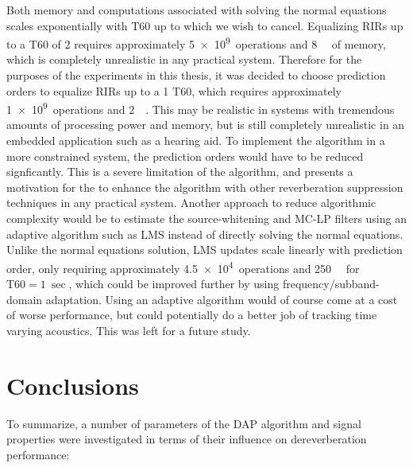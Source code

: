 Both memory and computations associated with solving the normal equations scales exponentially with T60 up to which we wish to cancel. Equalizing RIRs up to a T60 of \qty{2}{\sec} requires approximately \qty{5e9}{operations} and  \qty{8}{\giga\byte} of memory, which is completely unrealistic in any practical system. Therefore for the purposes of the experiments in this thesis, it was decided to choose prediction orders to equalize RIRs up to a \qty{1}{\sec} T60, which requires approximately \qty{1e9}{operations} and \qty{2}{\giga\byte}. This may be realistic in systems with tremendous amounts of processing power and memory, but is still completely unrealistic in an embedded application such as a hearing aid. To implement the algorithm in a more constrained system, the prediction orders would have to be reduced signficantly. This is a severe limitation of the algorithm, and presents a motivation for the to enhance the algorithm with other reverberation suppression techniques in any practical system. Another approach to reduce algorithmic complexity would be to estimate the source-whitening and MC-LP filters using an adaptive algorithm such as LMS instead of directly solving the normal equations. Unlike the normal equations solution, LMS updates scale linearly with prediction order, only requiring approximately \qty{4.5e4}{operations} and \qty{250}{\kilo\byte} for $\mathrm{T60} = \qty{1}{\sec}$, which could be improved further by using frequency/subband-domain adaptation. Using an adaptive algorithm would of course come at a cost of worse performance, but could potentially do a better job of tracking time varying acoustics. This was left for a future study.


\section{Conclusions}

To summarize, a number of parameters of the DAP algorithm and signal properties were investigated in terms of their influence on dereverberation performance: 

